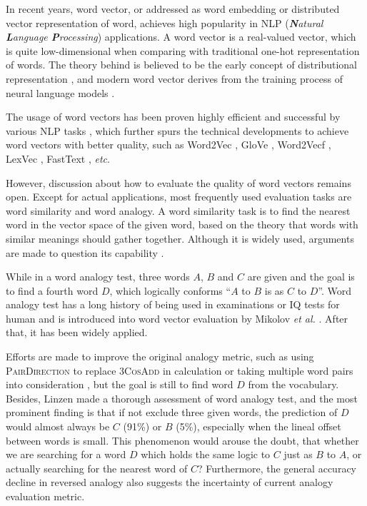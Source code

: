 \documentclass[11pt,letterpaper]{article}
\begin{document}
In recent years, word vector, or addressed as word embedding or distributed vector representation of word, achieves high popularity in NLP (\textit{\textbf{N}atural \textbf{L}anguage \textbf{P}rocessing}) applications. A word vector is a real-valued vector, which is quite low-dimensional when comparing with traditional one-hot representation of words. The theory behind is believed to be the early concept of distributional representation \cite{hinton1986learning}, and modern word vector derives from the training process of neural language models \cite{bengio2003neural}.

The usage of word vectors has been proven highly efficient and successful by various NLP tasks \cite{collobert2011natural}, which further spurs the technical developments to achieve word vectors with better quality, such as Word2Vec \cite{mikolov2013efficient}, GloVe \cite{pennington2014glove}, Word2Vecf \cite{levy2014dependency}, LexVec \cite{salle2016matrix}, FastText \cite{bojanowski2016enriching}, \textit{etc}. 

However, discussion about how to evaluate the quality of word vectors remains open. Except for actual applications, most frequently used evaluation tasks are word similarity and word analogy. A word similarity task is to find the nearest word in the vector space of the given word, based on the theory that words with similar meanings should gather together. Although it is widely used, arguments are made to question its capability \cite{batchkarov2016critique,faruqui2016problems}.

While in a word analogy test, three words $A$, $B$ and $C$ are given and the goal is to find a fourth word $D$, which logically conforms ``$A$ to $B$ is as $C$ to $D$''. Word analogy test has a long history of being used in examinations or IQ tests for human \cite{mcclelland1973testing,sternberg1985beyond} and is introduced into word vector evaluation by Mikolov \textit{et al.} . After that, it has been widely applied.


Efforts are made to improve the original analogy metric, such as using \textsc{PairDirection} to replace \textsc{3CosAdd} in calculation \cite{levy2014linguistic} or taking multiple word pairs into consideration \cite{drozd2016word}, but the goal is still to find word $D$ from the vocabulary.  Besides, Linzen  made a thorough assessment of word analogy test, and the most prominent finding is that if not exclude three given words, the prediction of $D$ would almost always be $C$ (91\%) or $B$ (5\%), especially when the lineal offset between words is small. This phenomenon would arouse the doubt, that whether we are searching for a word $D$ which holds the same logic to $C$ just as $B$ to $A$, or actually searching for the nearest word of $C$? Furthermore, the general accuracy decline in reversed analogy also suggests the incertainty of current analogy evaluation metric.
\end{document}
